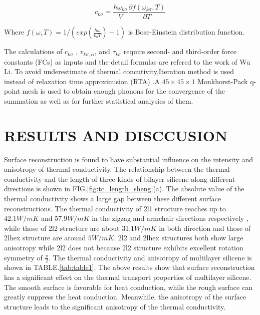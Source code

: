 \documentclass[%
 reprint,
 amsmath,amssymb,
 aps,
 prb,
]{revtex4-1}
\begin{document}
\begin{equation}
  c_{k \sigma}=\frac{\hbar \omega_{k \sigma} }{V} \frac{\partial f(\omega_{k \sigma},T)}{\partial T} \label{eq:cv}
\end{equation}

Where $ f(\omega,T)=1/(exp(\frac{\hbar \omega}{k_b T})-1)$ is Bose-Einstein distribution function.

The calculations of $c_{k\sigma}$ , $v_{k\sigma,\alpha}$, and $\tau_{k\sigma}$ require second- and third-order force constants (FCs) as inputs and the detail formulas are refered to the work of  Wu Li\cite{Li2014}. To avoid underestimate of thermal concutivity,Iteration method is used instead of relaxation time approximision (RTA) .A $45\times 45 \times 1$ Monkhorst-Pack q-point mesh is used to obtain enough phonons for the convergence of the summation as well as for further statistical analysics of them.



\section{RESULTS AND DISCCUSION}

Surface reconstruction is found to have substantial influence on the intensity and anisotropy of thermal conductivity. The relationship between the thermal conductivity  and the length of three kinds of bilayer silicene along different directions is shown in FIG.\ref{fig:tc_length_sheng}(a). The absolute value of the thermal conductivity shows a large gap between these different surface reconstructions. The thermal conductivity of 2l1 structure reaches up to $42.1W/mK$ and $57.9W/mK$ in the zigzag and armchair directions respectively , while those of 2l2 structure are about $31.1W/mK$ in both direction and those of 2lhex structure are around $5W/mK$. 2l2 and 2lhex structures both show large anisotropy while 2l2 does not because 2l2 structure exhibits excellent rotation symmetry of $\frac{\pi}{2}$. The thermal conductivity and anisotropy of multilayer silicene is shown in TABLE.\ref{tab:table1}.   The above results show that surface reconstruction has a significant effect on the thermal transport properties of multilayer silicene. The smooth surface is favorable for heat conduction, while the rough surface can greatly suppress the heat conduction. Meanwhile, the anisotropy of the surface structure leads to the significant anisotropy of the thermal conductivity.
\end{document}
